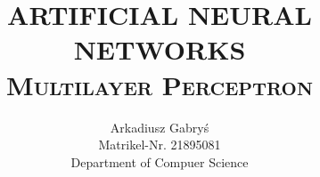 \documentclass[12pt,a4paper,titlepage]{article}
\title{\large{ARTIFICIAL NEURAL NETWORKS} \\
	\huge{\textsc{Multilayer Perceptron}}}
\author{Arkadiusz Gabryś \\
		Matrikel-Nr. 21895081 \\
		Department of Compuer Science}
\begin{document}
\maketitle                %

\thispagestyle{empty}     %
\ \\[0.2cm]               %
\ \\[0.2cm]               %
\tableofcontents          %
\cleardoublepage          %

\setcounter{page}{1}      %







\end{document}
